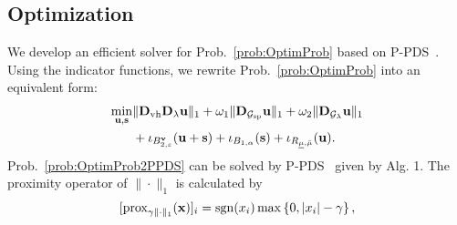 \subsection{Optimization}
\label{subsec:Optim}
We develop an efficient solver for Prob.~\eqref{prob:OptimProb} based on P-PDS~\cite{Pock2011PPDS}.
Using the indicator functions, we rewrite Prob.~\eqref{prob:OptimProb} into an equivalent form:
\begin{align}
    \label{prob:OptimProb2PPDS}
    \min_{\mathbf{u}, \mathbf{s}} 
    & \|\mathbf{D}_{\text{vh}} \mathbf{D}_{\lambda} \mathbf{u} \|_{1} + \omega_{1} \|\mathbf{D}_{\mathcal{G}_{\text{sp}}} \mathbf{u} \|_{1} + \omega_{2} \|\mathbf{D}_{\mathcal{G}_{\lambda}} \mathbf{u} \|_{1} \notag \\ 
    & + \iota_{B_{2, \varepsilon}^{\mathbf{v}}} (\mathbf{u} + \mathbf{s}) + \iota_{B_{1, \alpha}} (\mathbf{s}) + \iota_{R_{\underline{\mu},\bar{\mu}}} (\mathbf{u}).
\end{align}
Prob.~\eqref{prob:OptimProb2PPDS} can be solved by P-PDS~\cite{Pock2011PPDS} given by Alg. 1.
The proximity operator of $\| \cdot \|_{1}$ is calculated by
\begin{equation}
    \label{eq:ProxL1norm}
    \lbrack \operatorname{prox}_{\gamma_{} \| \cdot \|_1}(\mathbf{x}) \rbrack_{i} = \operatorname{sgn}(x_{i}) \max \left\{ 0, |x_{i}| - \gamma_{} \right\},
\end{equation}
